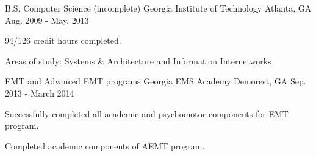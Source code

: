 

\begin{cventries}

  \cventry
    {B.S. Computer Science (incomplete)} %
    {Georgia Institute of Technology} %
    {Atlanta, GA} %
    {Aug. 2009 - May. 2013} %
    {
      \begin{cvitems} %
        \item {94/126 credit hours completed.}
        \item {Areas of study: Systems \& Architecture and Information Internetworks}
      \end{cvitems}
    }

  \cventry
    {EMT and Advanced EMT programs} %
    {Georgia EMS Academy} %
    {Demorest, GA} %
    {Sep. 2013 - March 2014} %
    {
      \begin{cvitems} %
        \item {Successfully completed all academic and psychomotor components for EMT program.}
        \item {Completed academic components of AEMT program.}
      \end{cvitems}
    }
\end{cventries}
